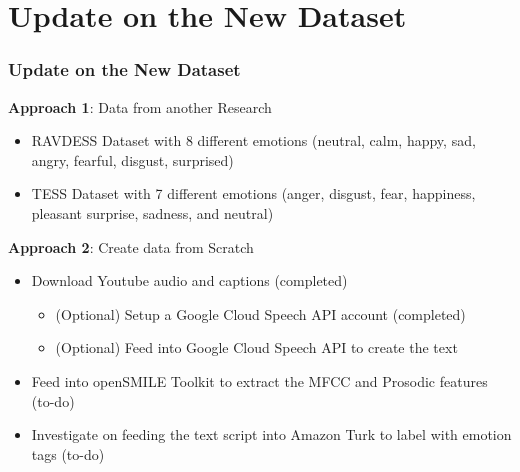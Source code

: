 \documentclass{beamer}
\begin{document}

\section{Update on the New Dataset}




\begin{frame}[fragile]
  \frametitle{Update on the New Dataset}
    
    \textbf{Approach 1}: Data from another Research
    \begin{itemize}
        \item RAVDESS Dataset with 8 different emotions (neutral, calm, happy, sad, angry, fearful, disgust, surprised)
        \item TESS Dataset with 7 different emotions (anger, disgust, fear, happiness, pleasant surprise, sadness, and neutral)
    \end{itemize}
    
    \textbf{Approach 2}: Create data from Scratch
    \begin{itemize}
        \item Download Youtube audio and captions (completed)
        \begin{itemize}
            \item (Optional) Setup a Google Cloud Speech API account (completed)
            \item (Optional) Feed into Google Cloud Speech API to create the text
        \end{itemize}
        \item Feed into openSMILE Toolkit to extract the MFCC and Prosodic features (to-do)
        \item Investigate on feeding the text script into Amazon Turk to label with emotion tags (to-do)
    \end{itemize}

\end{frame}
\end{document}

